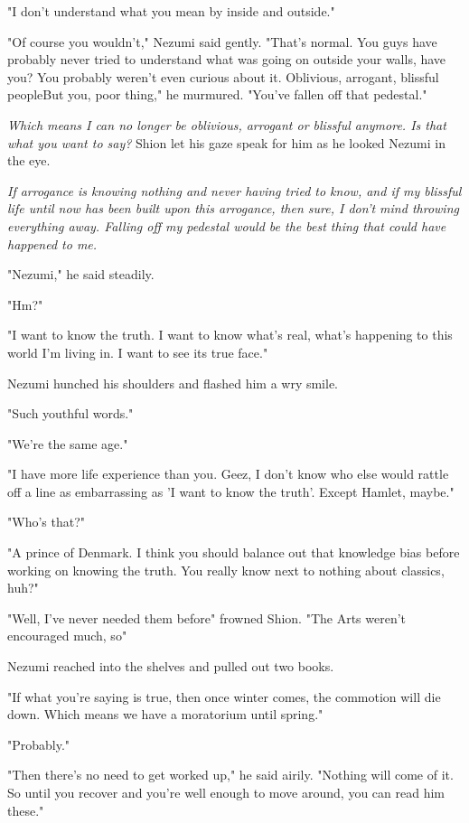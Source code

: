 "I don't understand what you mean by inside and outside."

"Of course you wouldn't," Nezumi said gently. "That's normal. You guys
have probably never tried to understand what was going on outside your
walls, have you? You probably weren't even curious about it. Oblivious,
arrogant, blissful people\el But you, poor thing," he murmured. "You've
fallen off that pedestal."

\emph{Which means I can no longer be oblivious, arrogant or blissful anymore.
Is that what you want to say?} Shion let his gaze speak for him as he
looked Nezumi in the eye.

\emph{If arrogance is knowing nothing and never having tried to know, and if
my blissful life until now has been built upon this arrogance, then
sure, I don't mind throwing everything away. Falling off my pedestal
would be the best thing that could have happened to me.}

"Nezumi," he said steadily.

"Hm?"

"I want to know the truth. I want to know what's real, what's happening
to this world I'm living in. I want to see its true face."

Nezumi hunched his shoulders and flashed him a wry smile.

"Such youthful words."

"We're the same age."

"I have more life experience than you. Geez, I don't know who else would
rattle off a line as embarrassing as 'I want to know the truth'. Except
Hamlet, maybe."

"Who's that?"

"A prince of Denmark. I think you should balance out that knowledge bias
before working on knowing the truth. You really know next to nothing
about classics, huh?"

"Well, I've never needed them before\el " frowned Shion. "The Arts
weren't encouraged much, so\el "

Nezumi reached into the shelves and pulled out two books.

"If what you're saying is true, then once winter comes, the commotion
will die down. Which means we have a moratorium until spring."

"Probably."

"Then there's no need to get worked up," he said airily. "Nothing will
come of it. So until you recover and you're well enough to move around,
you can read him these."

